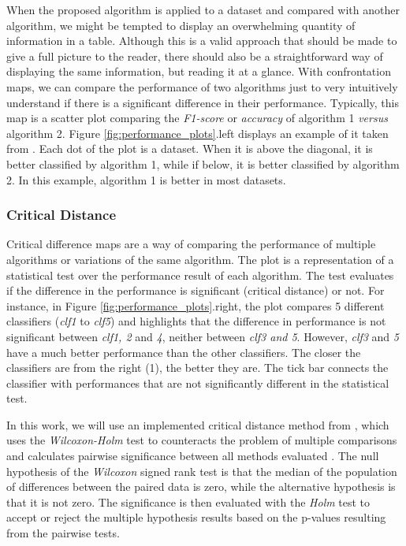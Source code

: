When the proposed algorithm is applied to a dataset and compared with another algorithm, we might be tempted to display an overwhelming quantity of information in a table. Although this is a valid approach that should be made to give a full picture to the reader, there should also be a straightforward way of displaying the same information, but reading it at a glance. With confrontation maps, we can compare the performance of two algorithms just to very intuitively understand if there is a significant difference in their performance. Typically, this map is a scatter plot comparing the \textit{F1-score} or \textit{accuracy} of algorithm 1 \textit{versus} algorithm 2. Figure \ref{fig:performance_plots}.left displays an example of it taken from \cite{keogh_presentation}. Each dot of the plot is a dataset. When it is above the diagonal, it is better classified by algorithm 1, while if below, it is better classified by algorithm 2. In this example, algorithm 1 is better in most datasets.

\subsubsection{Critical Distance}

Critical difference maps are a way of comparing the performance of multiple algorithms or variations of the same algorithm. The plot is a representation of a statistical test over the performance result of each algorithm. The test evaluates if the difference in the performance is significant (critical distance) or not. For instance, in Figure \ref{fig:performance_plots}.right, the plot compares 5 different classifiers (\textit{clf1} to \textit{clf5}) and highlights that the difference in performance is not significant between \textit{clf1, 2} and \textit{4}, neither between \textit{clf3 and 5}. However, \textit{clf3} and \textit{5} have a much better performance than the other classifiers. The closer the classifiers are from the right (1), the better they are. The tick bar connects the classifier with performances that are not significantly different in the statistical test.
\par
In this work, we will use an implemented critical distance method from \cite{critical_dif}, which uses the  \textit{Wilcoxon-Holm} test to counteracts the problem of multiple comparisons and calculates pairwise significance between all methods evaluated \cite{stat_test}. The null hypothesis of the \textit{Wilcoxon} signed rank test is that the median of the population of differences between the paired data is zero, while the alternative hypothesis is that it is not zero. The significance is then evaluated with the \textit{Holm} test to accept or reject the multiple hypothesis results based on the p-values resulting from the pairwise tests.